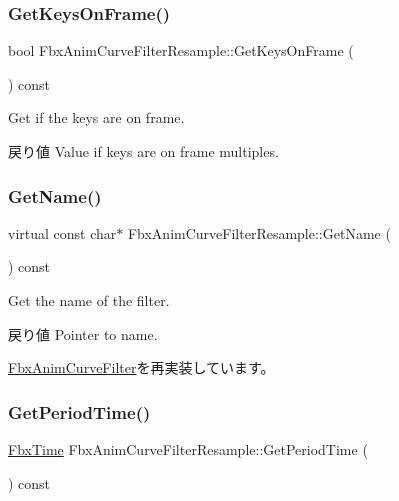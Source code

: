 \subsubsection{\texorpdfstring{Get\+Keys\+On\+Frame()}{GetKeysOnFrame()}}
{\footnotesize\ttfamily bool Fbx\+Anim\+Curve\+Filter\+Resample\+::\+Get\+Keys\+On\+Frame (\begin{DoxyParamCaption}{ }\end{DoxyParamCaption}) const}

Get if the keys are on frame. \begin{DoxyReturn}{戻り値}
Value if keys are on frame multiples. 
\end{DoxyReturn}
\mbox{\label{class_fbx_anim_curve_filter_resample_a67303296eba915d2a9fde63c2557c3f9}} 
\subsubsection{\texorpdfstring{Get\+Name()}{GetName()}}
{\footnotesize\ttfamily virtual const char$\ast$ Fbx\+Anim\+Curve\+Filter\+Resample\+::\+Get\+Name (\begin{DoxyParamCaption}{ }\end{DoxyParamCaption}) const\hspace{0.3cm}{\ttfamily [virtual]}}

Get the name of the filter. \begin{DoxyReturn}{戻り値}
Pointer to name. 
\end{DoxyReturn}


\hyperlink{class_fbx_anim_curve_filter_abd559d5052fbb072042e59241940a35c}{Fbx\+Anim\+Curve\+Filter}を再実装しています。

\mbox{\label{class_fbx_anim_curve_filter_resample_a0efe607fa3febdd058b03a7ac444bfd4}} 
\subsubsection{\texorpdfstring{Get\+Period\+Time()}{GetPeriodTime()}}
{\footnotesize\ttfamily \hyperlink{class_fbx_time}{Fbx\+Time} Fbx\+Anim\+Curve\+Filter\+Resample\+::\+Get\+Period\+Time (\begin{DoxyParamCaption}{ }\end{DoxyParamCaption}) const}

